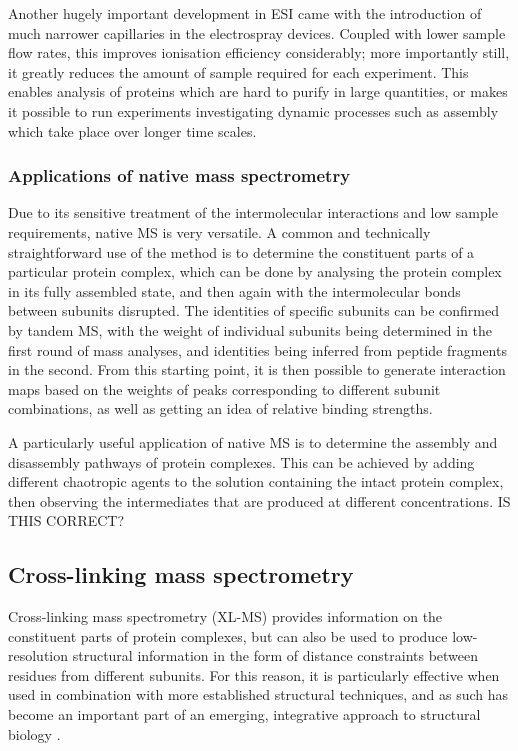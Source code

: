 \documentclass[a4paper,11pt,twoside,openright]{scrbook}
\begin{document}
Another hugely important development in ESI came with the introduction of much narrower capillaries in the electrospray devices. Coupled with lower sample flow rates, this improves ionisation efficiency considerably; more importantly still, it greatly reduces the amount of sample required for each experiment. This enables analysis of proteins which are hard to purify in large quantities, or makes it possible to run experiments investigating dynamic processes such as assembly which take place over longer time scales.

\subsubsection{Applications of native mass spectrometry}
Due to its sensitive treatment of the intermolecular interactions and low sample requirements, native MS is very versatile. A common and technically straightforward use of the method is to determine the constituent parts of a particular protein complex, which can be done by analysing the protein complex in its fully assembled state, and then again with the intermolecular bonds between subunits disrupted. The identities of specific subunits can be confirmed by tandem MS, with the weight of individual subunits being determined in the first round of mass analyses, and identities being inferred from peptide fragments in the second. From this starting point, it is then possible to generate interaction maps based on the weights of peaks corresponding to different subunit combinations, as well as getting an idea of relative binding strengths.

A particularly useful application of native MS is to determine the assembly and disassembly pathways of protein complexes. This can be achieved by adding different chaotropic agents to the solution containing the intact protein complex, then observing the intermediates that are produced at different concentrations. IS THIS CORRECT?


\subsection{Cross-linking mass spectrometry}
Cross-linking mass spectrometry (XL-MS) provides information on the constituent parts of protein complexes, but can also be used to produce low-resolution structural information in the form of distance constraints between residues from different subunits. For this reason, it is particularly effective when used in combination with more established structural techniques, and as such has become an important part of an emerging, integrative approach to structural biology \cite{Stengel2012,Ward2013,VandenBedem2015}.
\end{document}
